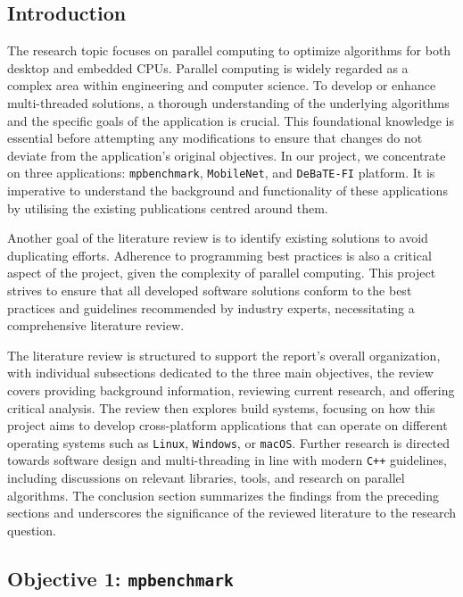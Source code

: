 \subsection{Introduction}
The research topic focuses on parallel computing to optimize algorithms for both desktop and embedded CPUs. Parallel computing is widely regarded as a complex area within engineering and computer science. To develop or enhance multi-threaded solutions, a thorough understanding of the underlying algorithms and the specific goals of the application is crucial. This foundational knowledge is essential before attempting any modifications to ensure that changes do not deviate from the application’s original objectives. In our project, we concentrate on three applications: \texttt{mpbenchmark}, \texttt{MobileNet}, and \texttt{DeBaTE-FI} platform. It is imperative to understand the background and functionality of these applications by utilising the existing publications centred around them. 

Another goal of the literature review is to identify existing solutions to avoid duplicating efforts. Adherence to programming best practices is also a critical aspect of the project, given the complexity of parallel computing. This project strives to ensure that all developed software solutions conform to the best practices and guidelines recommended by industry experts, necessitating a comprehensive literature review.

The literature review is structured to support the report's overall organization, with individual subsections dedicated to the three main objectives, the review covers providing background information, reviewing current research, and offering critical analysis. The review then explores build systems, focusing on how this project aims to develop cross-platform applications that can operate on different operating systems such as \texttt{Linux}, \texttt{Windows}, or \texttt{macOS}. Further research is directed towards software design and multi-threading in line with modern \texttt{C++} guidelines, including discussions on relevant libraries, tools, and research on parallel algorithms. The conclusion section summarizes the findings from the preceding sections and underscores the significance of the reviewed literature to the research question.

\subsection{Objective 1: \texttt{mpbenchmark}}

